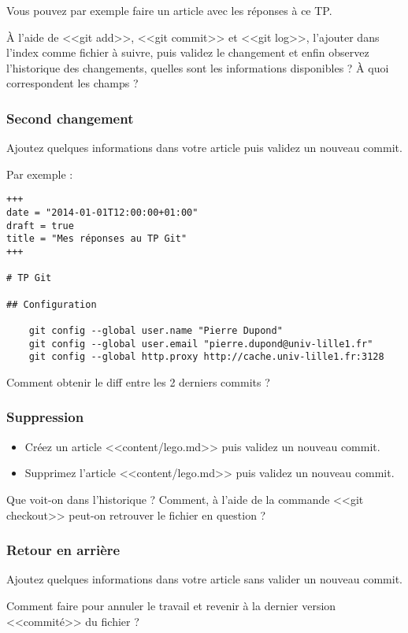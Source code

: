 \documentclass[a4paper]{article}
\begin{document}
Vous pouvez par exemple faire un article avec les réponses à ce TP.

À l'aide de <<git add>>, <<git commit>> et <<git log>>, l'ajouter dans l'index comme fichier à suivre, puis validez le changement et enfin observez l'historique des changements, quelles sont les informations disponibles ? À quoi correspondent les champs ?

\subsubsection{Second changement}
Ajoutez quelques informations dans votre article puis validez un nouveau commit.

Par exemple : 
\begin{verbatim}
+++
date = "2014-01-01T12:00:00+01:00"
draft = true
title = "Mes réponses au TP Git"
+++

# TP Git

## Configuration

    git config --global user.name "Pierre Dupond"
    git config --global user.email "pierre.dupond@univ-lille1.fr"
    git config --global http.proxy http://cache.univ-lille1.fr:3128

\end{verbatim}

Comment obtenir le diff entre les 2 derniers commits ?

\subsubsection{Suppression}
\begin{itemize}
\item Créez un article <<content/lego.md>> puis validez un nouveau commit. 
\item Supprimez l'article <<content/lego.md>> puis validez un nouveau commit. 
\end{itemize}

Que voit-on dans l'historique ?
Comment, à l'aide de la commande <<git checkout>> peut-on retrouver le fichier en question ?

\subsubsection{Retour en arrière}
Ajoutez quelques informations dans votre article sans valider un nouveau commit.

Comment faire pour annuler le travail et revenir à la dernier version <<commité>> du fichier ?
\end{document}

